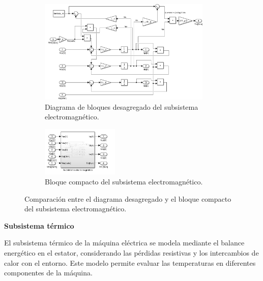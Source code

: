 \documentclass{article}
\begin{document}
\begin{figure}[H]
    \centering
    \begin{subfigure}[t]{\textwidth}
        \centering
        \includegraphics[width=0.90\textwidth]{Imagenes/BloquesSistElectromagnetico.png}
        \caption{Diagrama de bloques desagregado del subsistema electromagnético.}
        \label{fig:BloquesElectromagnetico}
    \end{subfigure}
    
    \vspace{0.5cm} %
    
    \begin{subfigure}[t]{\textwidth}
        \centering
        \includegraphics[width=0.4\textwidth]{Imagenes/CompactoSistElectromagnetico.png}
        \caption{Bloque compacto del subsistema electromagnético.}
        \label{fig:bloque_electromagnetico_compacto}
    \end{subfigure}
    
    \caption{Comparación entre el diagrama desagregado y el bloque compacto del subsistema electromagnético.}
    \label{fig:bloques_park_inversa}
\end{figure}

\textbf{Subsistema térmico}

El subsistema térmico de la máquina eléctrica se modela mediante el balance energético en el estator, considerando las pérdidas resistivas y los intercambios de calor con el entorno. Este modelo permite evaluar las temperaturas en diferentes componentes de la máquina.
\end{document}
